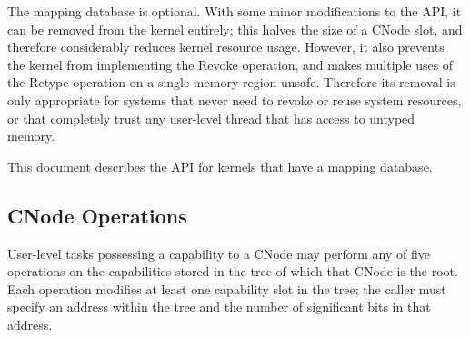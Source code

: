 The mapping database is optional. With some minor modifications to the API, it
can be removed from the kernel entirely; this halves the size of a CNode slot,
and therefore considerably reduces kernel resource usage. However, it also
prevents the kernel from implementing the Revoke operation, and makes multiple
uses of the Retype operation on a single memory region unsafe. Therefore its
removal is only appropriate for systems that never need to revoke or reuse
system resources, or that completely trust any user-level thread that has
access to untyped memory.

This document describes the API for kernels that have a mapping database.

\subsection[cnodes]{CNode Operations}

User-level tasks possessing a capability to a CNode may perform any of five
operations on the capabilities stored in the tree of which that CNode is the
root. Each operation modifies at least one capability slot in the tree; the
caller must specify an address within the tree and the number of significant
bits in that address.

